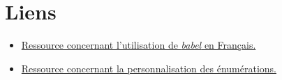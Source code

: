 \section{Liens}

\begin{itemize}
    \item \href{http://lesfichesabebert.fr/latex/Français.html}{Ressource concernant l'utilisation de \textit{babel} en Français.}
    \item \href{http://lesfichesabebert.fr/latex/Listes.html}{Ressource concernant la personnalisation des énumérations.}
\end{itemize}
